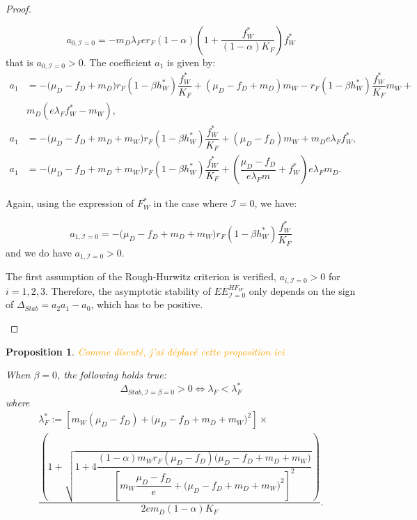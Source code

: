 \documentclass{article}
\newcommand{\lfw}{\lambda_{F}}
\newcommand{\lfw}{\lambda_{F}}
\newcommand{\cI}{\mathcal{I}}
\newcommand{\vdeux}[1]{\textcolor{orange}{#1}}
\newtheorem{prop}[theorem]{Proposition}
\theoremstyle{definition}
\theoremstyle{remark}
\begin{document}
\begin{proof}
\begin{itemize}
\begin{equation*}
a_{0, \cI=0} = -m_D \lfw e r_F  (1- \alpha) \left(1 + \dfrac{f_W^*}{(1 - \alpha)K_F}\right) f_W^* 
\end{equation*}
that is $a_{0, \cI=0}>0$. The coefficient $a_1$ is given by:
\begin{subequations}
\begin{align}
a_1 &= - \big( \mu_D  -f_D + m_D) r_F(1 - \beta h_W^*) \dfrac{f^*_W}{K_F} + (\mu_D -f_D + m_D) m_W - r_F(1 - \beta h_W^*) \dfrac{f_W^*}{K_F} m_W + \\ \nonumber &m_D (e\lfw f^*_W - m_W), \\
a_1 &= - \big( \mu_D-f_D + m_D + m_W) r_F(1 - \beta h_W^*) \dfrac{f^*_W}{K_F} + (\mu_D -f_D) m_W  + m_D e\lfw f^*_W, \\
a_1 &= -\big( \mu_D  -f_D + m_D + m_W) r_F(1 - \beta h_W^*) \dfrac{f^*_W}{K_F} + \left(\dfrac{\mu_D -f_D}{e\lfw m} + f_W^*\right) e \lfw m_D . \label{equation:coefficient a1}
\end{align}
\end{subequations}

Again, using the expression of $F^*_W$ in the case where $\cI = 0$, we have:

\begin{equation*}
a_{1, \cI =0} = -\big( \mu_D  -f_D + m_D + m_W) r_F(1 - \beta h_W^*) \dfrac{f^*_W}{K_F}
\end{equation*}
and we do have $a_{1, \cI =0} > 0$.

The first assumption of the Rough-Hurwitz criterion is verified, $a_{i, \cI =0} > 0$ for $i=1,2,3$. Therefore, the asymptotic stability of $EE^{HF_W}_{\cI =0}$ only depends on the sign of $\Delta_{Stab}= a_2 a_1 - a_0$, which has to be positive. 
\end{itemize}
\end{proof}


\begin{prop} \label{prop:stab, cI=beta=0}
\vdeux{Comme discuté, j'ai déplacé cette proposition ici}

When $\beta = 0$, the following holds true:
$$ \Delta_{Stab, \cI = \beta = 0} > 0 \Leftrightarrow \lfw < \lfw^*$$
where 
\begin{multline*}
\lfw^* := \left[m_{W}(\mu_{D}-f_{D})+\big(\mu_{D}-f_{D}+m_{D}+m_{W})^{2}\right] \times \\
 \dfrac{\left(1+\sqrt{1+4\dfrac{(1-\alpha)m_{W}r_{F}\left(\mu_{D}-f_{D}\right)\big(\mu_{D}-f_{D}+m_{D}+m_{W})}{\left[m_{W}\dfrac{\mu_{D}-f_{D}}{e}+\big(\mu_{D}-f_{D}+m_{D}+m_{W})^{2}\right]^{2}}}\right)}{2em_D (1-\alpha) K_F }.
\end{multline*}
\end{prop}
\end{document}

